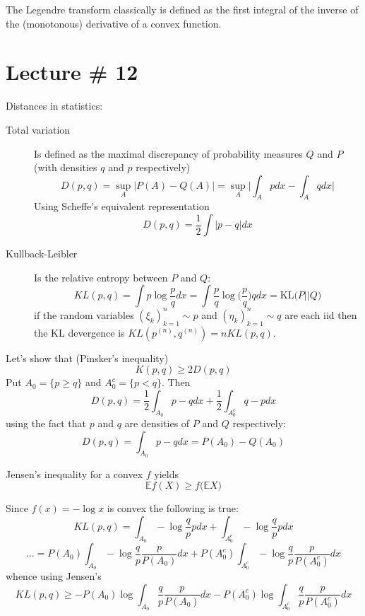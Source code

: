 \documentclass[a4paper]{article}
\newcommand{\Ex}{\mathbb{E}}
\begin{document}
The Legendre transform classically is defined as the first integral of the inverse of the (monotonous) derivative of a convex function.



\section{Lecture \# 12} %
\label{sec:lecture_12}

Distances in statistics:
\begin{description}
	\item[Total variation] Is defined as the maximal discrepancy of probability measures $Q$ and $P$ (with densities $q$ and $p$ respectively)
	\[D(p,q) = \sup_A\Big\lvert P(A) -  Q(A) \Big\rvert = \sup_A\Big\lvert \int_A p dx -  \int_A q dx \Big\rvert\]
	Using Scheffe's equivalent representation \[D(p,q) = \frac{1}{2}\int|p-q| dx\]
	\item[Kullback-Leibler] Is the relative entropy between $P$ and $Q$:
	\[ KL(p,q) = \int p \log\frac{p}{q} dx = \int \frac{p}{q}\log\bigg(\frac{p}{q}\bigg) q dx = \text{KL}\big( P \lvert \rvert Q\big)\]
	if the random variables $(\xi_k)_{k=1}^n\sim p$ and $(\eta_k)_{k=1}^n\sim q$ are each iid then the KL devergence is $KL(p^{(n)},q^{(n)}) = n KL(p,q)$.
\end{description}

Let's show that (Pinsker's inequality)
\[K(p,q)\geq 2 D(p,q)\]
Put $A_0 = \{ p \geq q \}$ and $A_0^c = \{p < q\}$. Then 
\[D(p,q) = \frac{1}{2}\int_{A_0} p-q dx + \frac{1}{2}\int_{A_0^c} q - p dx \]
using the fact that $p$ and $q$ are densities of $P$ and $Q$ respectively:
\[D(p,q) = \int_{A_0} p-q dx = P(A_0) - Q(A_0)\]

Jensen's inequality for a convex $f$ yields
\[\Ex f(X) \geq f\big(\Ex X\big)\]

Since $f(x) = -\log x$ is convex the following is true:
\[KL(p,q) = \int_{A_0} -\log\frac{q}{p} p dx + \int_{A_0^c} -\log\frac{q}{p} p dx \]
\[\ldots = P(A_0) \int_{A_0} -\log\frac{q}{p} \frac{p}{P(A_0)} dx + P(A_0^c) \int_{A_0^c} -\log\frac{q}{p} \frac{p}{P(A_0^c)} dx \]
whence using Jensen's
\[KL(p,q) \geq  -P(A_0) \log \int_{A_0}\frac{q}{p} \frac{p}{P(A_0)} dx - P(A_0^c) \log \int_{A_0^c} \frac{q}{p} \frac{p}{P(A_0^c)} dx\]
\end{document}
